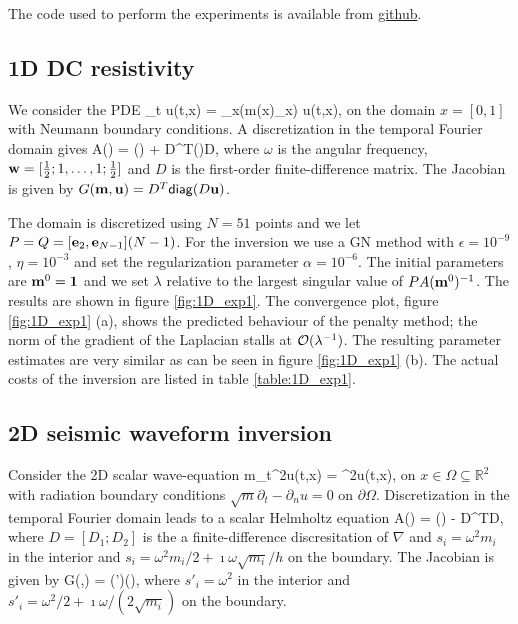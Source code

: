 \documentclass{iopart}
\begin{document}
The code used to perform the experiments is available from \url{github}.

\subsection{1D DC resistivity}
We consider the PDE
\bq
\partial_t u(t,x) = \partial_x\left(m(x)\partial_x\right) u(t,x),
\eq
on the domain $x = [0,1]$ with Neumann boundary conditions. 
A discretization in the temporal Fourier domain gives
\bq
A() = \imath\omega{}() + D^T()D,
\eq
where $\omega$ is the angular frequency, $\mathbf{w} = [\frac{1}{2}; 1, \ldots, 1; \frac{1}{2}]$ and $D$ is the first-order finite-difference matrix. 
The Jacobian is given by $G(\mathbf{m},\mathbf{u}) = D^T\mathsf{diag}(D\mathbf{u})$. 

The domain is discretized using $N=51$ points and we let $P = Q = [\mathbf{e}_2, \mathbf{e}_{N-1}](N-1)$.
For the inversion we use a GN method with $\epsilon=10^{-9}$, $\eta=10^{-3}$ and set the regularization parameter $\alpha = 10^{-6}$.
The initial parameters are $\mathbf{m}^0 = \mathbf{1}$ and we set $\lambda$ relative to the largest singular value of $PA(\mathbf{m}^0)^{-1}$.
The results are shown in figure \ref{fig:1D_exp1}. The convergence plot, figure \ref{fig:1D_exp1} (a), shows the predicted behaviour of the penalty method; the norm
of the gradient of the Laplacian stalls at $\mathcal{O}(\lambda^{-1})$. The resulting parameter estimates are very similar as can be seen 
in figure \ref{fig:1D_exp1} (b). The actual costs of the inversion are listed in table \ref{table:1D_exp1}.

\subsection{2D seismic waveform inversion}
Consider the 2D scalar wave-equation
\bq
m\partial_t^2u(t,x) = \nabla^2u(t,x),
\eq
on $x \in \Omega \subseteq \mathbb{R}^2$  with radiation boundary conditions $\sqrt{m}\partial_t - \partial_n u = 0$ on $\partial\Omega$.
Discretization in the temporal Fourier domain leads to a scalar Helmholtz equation
\bq
A() = () - D^TD,
\eq
where $D = [D_1; D_2]$ is the a finite-difference discresitation of $\nabla$ and $s_i = \omega^2 m_i$ in the interior 
and $s_i = \omega^2 m_i/2 + \imath\omega\sqrt{m_i}/h$ on the boundary.
The Jacobian is given by
\bq
G(,) = (')(),
\eq
where $s'_i = \omega^2$ in the interior and $s'_i = \omega^2/2 + \imath\omega/(2\sqrt{m_i})$ on the boundary.
\end{document}
